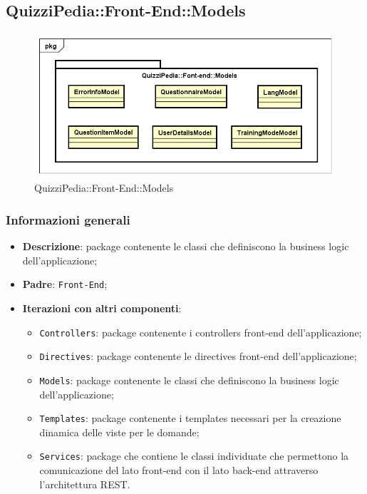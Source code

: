 \newpage

\subsection{QuizziPedia::Front-End::Models}

	\label{QuizziPedia::Front-End::Models}
	
	\begin{figure}[ht]
		\centering
		\includegraphics[scale=0.5,keepaspectratio]{UML/Package/QuizziPedia_Front-End_Models.png}
		\caption{QuizziPedia::Front-End::Models}
	\end{figure} \FloatBarrier

	\subsubsection{Informazioni generali}
		\begin{itemize}
			\item \textbf{Descrizione}: package contenente le classi che definiscono la business logic dell'applicazione;
			\item \textbf{Padre}: \texttt{Front-End};
			\item \textbf{Iterazioni con altri componenti}: 
				\begin{itemize}				
					\item \texttt{Controllers}: package contenente i controllers front-end dell'applicazione;
					\item \texttt{Directives}: package contenente le directives front-end dell'applicazione;
					\item \texttt{Models}: package contenente le classi che definiscono la business logic dell'applicazione;
					\item \texttt{Templates}: package contenente i templates necessari per la creazione dinamica delle viste per le domande;
					\item \texttt{Services}: package che contiene le classi individuate che permettono la comunicazione del lato front-end con il lato back-end attraverso l'architettura REST.
				\end{itemize}

		\end{itemize}
	
